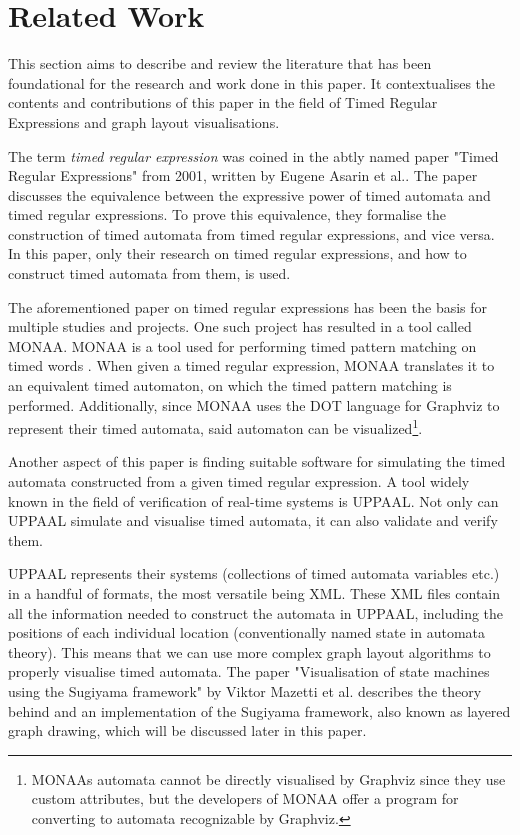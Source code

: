 \section{Related Work}



This section aims to describe and review the literature that has been foundational for the research and work done in this paper. It contextualises the contents and contributions of this paper in the field of Timed Regular Expressions and graph layout visualisations.

The term \textit{timed regular expression} was coined in the abtly named paper "Timed Regular Expressions" from 2001, written by Eugene Asarin et al.\cite{Eugene2001}. The paper discusses the equivalence between the expressive power of timed automata\cite{ALUR1994} and timed regular expressions. To prove this equivalence, they formalise the construction of timed automata from timed regular expressions, and vice versa. In this paper, only their research on timed regular expressions, and how to construct timed automata from them, is used.

The aforementioned paper on timed regular expressions has been the basis for multiple studies and projects. One such project has resulted in a tool called MONAA. MONAA is a tool used for performing timed pattern matching on timed words \cite{MONAA2017}. When given a timed regular expression, MONAA translates it to an equivalent timed automaton, on which the timed pattern matching is performed. Additionally, since MONAA uses the DOT language for Graphviz \cite{Graphviz} to represent their timed automata, said automaton can be visualized\footnote{MONAAs automata cannot be directly visualised by Graphviz since they use custom attributes, but the developers of MONAA offer a program for converting to automata recognizable by Graphviz\cite{MONAA2017}.}.

Another aspect of this paper is finding suitable software for simulating the timed automata constructed from a given timed regular expression. A tool widely known in the field of verification of real-time systems is UPPAAL. Not only can UPPAAL simulate and visualise timed automata, it can also validate and verify them\cite{UPPAAL}.

UPPAAL represents their systems (collections of timed automata variables etc.) in a handful of formats, the most versatile being XML\cite{UPPAAL}. These XML files contain all the information needed to construct the automata in UPPAAL, including the positions of each individual location (conventionally named state in automata theory). This means that we can use more complex graph layout algorithms to properly visualise timed automata. The paper "Visualisation of state machines using the Sugiyama framework" by Viktor Mazetti et al. describes the theory behind and an implementation of the Sugiyama framework, also known as layered graph drawing, which will be discussed later in this paper.